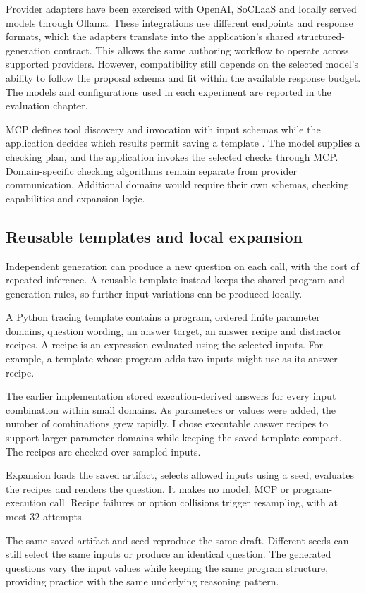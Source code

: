 Provider adapters have been exercised with OpenAI, SoCLaaS and locally served models through Ollama. These integrations use different endpoints and response formats, which the adapters translate into the application’s shared structured-generation contract. This allows the same authoring workflow to operate across supported providers. However, compatibility still depends on the selected model’s ability to follow the proposal schema and fit within the available response budget. The models and configurations used in each experiment are reported in the evaluation chapter.

MCP defines tool discovery and invocation with input schemas while the application decides which results permit saving a template \parencite{mcp2025}. The model supplies a checking plan, and the application invokes the selected checks through MCP. Domain-specific checking algorithms remain separate from provider communication. Additional domains would require their own schemas, checking capabilities and expansion logic.

\subsection{Reusable templates and local expansion}\label{sec:templates}

Independent generation can produce a new question on each call, with the cost of repeated inference. A reusable template instead keeps the shared program and generation rules, so further input variations can be produced locally.

A Python tracing template contains a program, ordered finite parameter domains, question wording, an answer target, an answer recipe and distractor recipes. A recipe is an expression evaluated using the selected inputs. For example, a template whose program adds two inputs might use  as its answer recipe.

The earlier implementation stored execution-derived answers for every input combination within small domains. As parameters or values were added, the number of combinations grew rapidly. I chose executable answer recipes to support larger parameter domains while keeping the saved template compact. The recipes are checked over sampled inputs.

Expansion loads the saved artifact, selects allowed inputs using a seed, evaluates the recipes and renders the question. It makes no model, MCP or program-execution call. Recipe failures or option collisions trigger resampling, with at most 32 attempts.

The same saved artifact and seed reproduce the same draft. Different seeds can still select the same inputs or produce an identical question. The generated questions vary the input values while keeping the same program structure, providing practice with the same underlying reasoning pattern.


